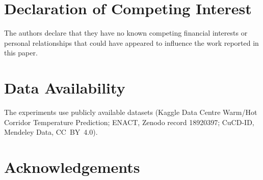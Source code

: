 \section*{Declaration of Competing Interest}
The authors declare that they have no known competing financial
interests or personal relationships that could have appeared to
influence the work reported in this paper.

\section*{Data Availability}
The experiments use publicly available datasets (Kaggle Data Centre
Warm/Hot Corridor Temperature Prediction; ENACT, Zenodo record 18920397;
CuCD-ID, Mendeley Data, CC~BY~4.0). 

\section*{Acknowledgements}
